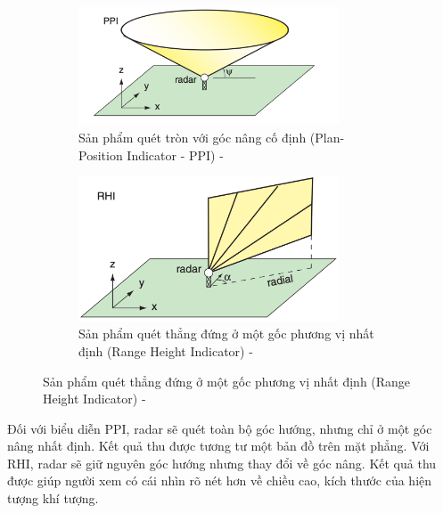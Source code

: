 \begin{figure}[htp!]
\centering
\begin{subfigure}{\textwidth}
    \centering
    \includegraphics[width=0.85\textwidth]{Images/2.1-ppi.png}
    \caption{Sản phẩm quét tròn với góc nâng cố định (Plan-Position Indicator - PPI) - \cite{2022Weather}}
    \label{fig:ppi}
\end{subfigure}

\begin{subfigure}{\textwidth}
    \centering
    \includegraphics[width=0.85\textwidth]{Images/2.1-rhi.png}
    \caption{Sản phẩm quét thẳng đứng ở một gốc phương vị nhất định (Range Height Indicator) - \cite{2022Weather}}
    \label{fig:rhi}
\end{subfigure}

\end{figure}

Đối với biểu diễn PPI, radar sẽ quét toàn bộ góc hướng, nhưng chỉ ở một góc nâng nhất định. Kết quả thu được tương tư một bản đồ trên mặt phẳng. Với RHI, radar sẽ giữ nguyên góc hướng nhưng thay đổi về góc nâng. Kết quả thu được giúp người xem có cái nhìn rõ nét hơn về chiều cao, kích thước của hiện tượng khí tượng.

